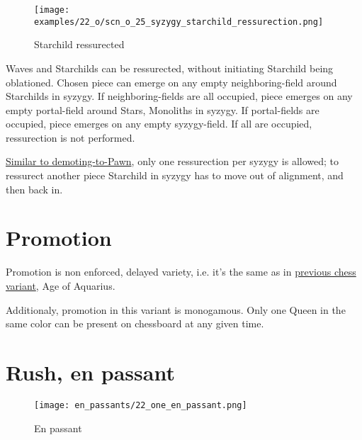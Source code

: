 \clearpage %

\vspace*{-2.1\baselineskip}
\noindent
\begin{figure}[!h]
\texttt{[image: examples/22\_o/scn\_o\_25\_syzygy\_starchild\_ressurection.png]}
\caption{Starchild ressurected}
\label{fig:scn_o_25_syzygy_starchild_ressurection}
\end{figure}

Waves and Starchilds can be ressurected, without initiating Starchild being oblationed. Chosen piece can emerge
on any empty neighboring-field around Starchilds in syzygy. If neighboring-fields are all occupied, piece emerges
on any empty portal-field around Stars, Monoliths in syzygy. If portal-fields are occupied, piece emerges on any
empty syzygy-field. If all are occupied, ressurection is not performed.

\clearpage %

\hyperref[fig:scn_d_16_syzygy_2_stars_steps]{Similar to demoting-to-Pawn}, only one ressurection per syzygy is
allowed; to ressurect another piece Starchild in syzygy has to move out of alignment, and then back in.

\section*{Promotion}
\label{sec:One/Promotion}

Promotion is non enforced, delayed variety, i.e. it's the same as in
\hyperref[sec:Age of Aquarius/Promotion]{previous chess variant}, Age of Aquarius.

Additionaly, promotion in this variant is monogamous.
Only one Queen in the same color can be present on chessboard at any given time.

\clearpage %

\section*{Rush, en passant}

\vspace*{-1.2\baselineskip}
\noindent
\begin{figure}[!h]
\texttt{[image: en\_passants/22\_one\_en\_passant.png]}
\caption{En passant}
\label{fig:22_one_en_passant}
\end{figure}

